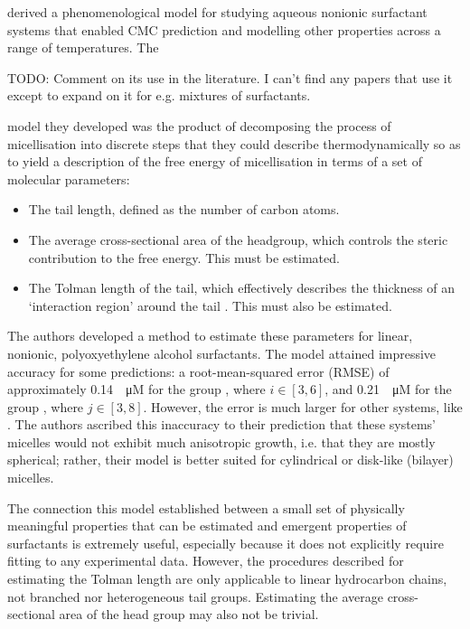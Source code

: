 \citet{puvvadaMolecularThermodynamicApproach1990} derived a phenomenological
model for studying aqueous nonionic surfactant systems that enabled CMC
prediction and modelling other properties across a range of temperatures. The

TODO: Comment on its use in the literature. I can't find any papers that use it except to
expand on it for e.g. mixtures of surfactants.

model they developed was the product of decomposing the process of micellisation
into discrete steps that they could describe thermodynamically so as to yield a
description of the free energy of micellisation in terms of a set of molecular
parameters:

\begin{itemize}
    \item The tail length, defined as the number of carbon atoms.
    \item The average cross-sectional area of the headgroup, which controls the
          steric contribution to the free energy. This must be estimated.
    \item The Tolman length of the tail, which effectively describes the
          thickness of an `interaction region' around the tail
          \cite{demiguelGibbsThermodynamicsSurface2021}. This must also be estimated.
\end{itemize}

The authors developed a method to estimate these parameters for linear,
nonionic, polyoxyethylene alcohol surfactants. The model attained impressive
accuracy for some predictions: a root-mean-squared error (RMSE) of approximately
\SI{0.14}{\log \micro M} for the group , where $i \in [3, 6]$, and
\SI{0.21}{\log \micro M} for the group , where $j \in [3, 8]$.
However, the error is much larger for other systems, like . The authors
ascribed this inaccuracy to their prediction that these systems' micelles would
not exhibit much anisotropic growth, i.e. that they are mostly spherical;
rather, their model is better suited for cylindrical or disk-like (bilayer)
micelles.

The connection this model established between a small set of physically meaningful properties that can be estimated and emergent properties of surfactants is extremely useful, especially because it does not explicitly require fitting to any experimental data. However, the procedures described for estimating the Tolman length are only applicable to linear hydrocarbon chains, not branched nor heterogeneous tail groups. Estimating the average cross-sectional area of the head group may also not be trivial.

